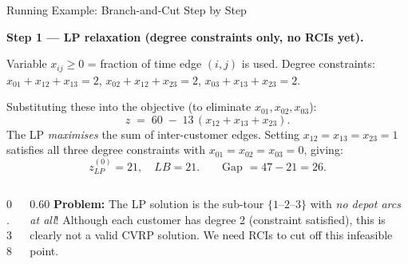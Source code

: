 \documentclass[aspectratio=169,10pt]{beamer}
\begin{document}
\begin{frame}[allowframebreaks]{Running Example: Branch-and-Cut Step by Step}
  \framebreak

  \textbf{Step 1 — LP relaxation (degree constraints only, no RCIs yet).}

  \smallskip
  Variable $x_{ij}\geq 0$ = fraction of time edge $(i,j)$ is used.
  Degree constraints: $x_{01}+x_{12}+x_{13}=2$,\;
  $x_{02}+x_{12}+x_{23}=2$,\; $x_{03}+x_{13}+x_{23}=2$.

  Substituting these into the objective (to eliminate $x_{01},x_{02},x_{03}$):
  \[
    z \;=\; 60 \;-\; 13\,(x_{12}+x_{13}+x_{23}).
  \]
  The LP \emph{maximises} the sum of inter-customer edges.
  Setting $x_{12}=x_{13}=x_{23}=1$ satisfies all three degree constraints with
  $x_{01}=x_{02}=x_{03}=0$, giving:
  \[
    \boxed{z_{LP}^{(0)}=21,\quad LB=21.}
    \qquad\text{Gap }=47-21=26.
  \]

  \begin{columns}
    \begin{column}{0.38\textwidth}
    \end{column}
    \begin{column}{0.60\textwidth}
      \textbf{Problem:} The LP solution is the sub-tour $\{1\text{--}2\text{--}3\}$
      with \emph{no depot arcs at all}!
      Although each customer has degree 2 (constraint satisfied), this is
      clearly not a valid CVRP solution.
      We need RCIs to cut off this infeasible point.
    \end{column}
  \end{columns}

  \framebreak


\end{frame}
\end{document}
